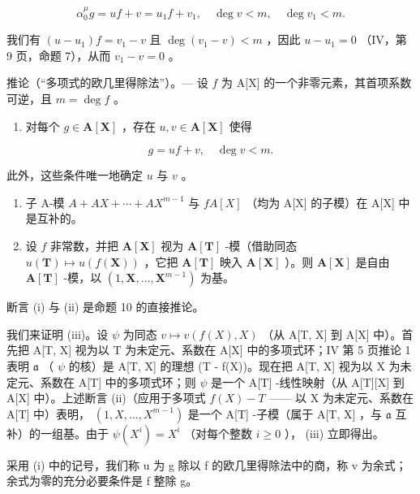 \[
\alpha_ {0} ^ {\mu} g = u f + v = u _ {1} f + v _ {1}, \quad \deg v <   m, \quad \deg v _ {1} <   m.
\]

我们有 \((u - u_{1})f = v_{1} - v\) 且 \(\deg (v_1 - v) < m\) ，因此 \(u - u_{1} = 0\) （IV，第 9 页，命题 7），从而 \(v_{1} - v = 0\) 。

推论（“多项式的欧几里得除法”）。--- 设 \(f\) 为 A{[}X{]} 的一个非零元素，其首项系数可逆，且 \(m = \deg f\) 。

\begin{enumerate}
\def\labelenumi{(\roman{enumi})}
\tightlist
\item
  对每个 \(g \in \mathbf{A}[\mathbf{X}]\) ，存在 \(u, v \in \mathbf{A}[\mathbf{X}]\) 使得
\end{enumerate}

\[
g = u f + v, \quad \deg v <   m.
\]

此外，这些条件唯一地确定 \(u\) 与 \(v\) 。

\begin{enumerate}
\def\labelenumi{(\roman{enumi})}
\setcounter{enumi}{1}
\item
  子 A-模 \(A + AX + \cdots + AX^{m-1}\) 与 \(fA[X]\) （均为 A{[}X{]} 的子模）在 A{[}X{]} 中是互补的。
\item
  设 \(f\) 非常数，并把 \(\mathbf{A}[\mathbf{X}]\) 视为 \(\mathbf{A}[\mathbf{T}]\) -模（借助同态 \(u(\mathbf{T}) \mapsto u(f(\mathbf{X}))\) ，它把 \(\mathbf{A}[\mathbf{T}]\) 映入 \(\mathbf{A}[\mathbf{X}]\) ）。则 \(\mathbf{A}[\mathbf{X}]\) 是自由 \(\mathbf{A}[\mathbf{T}]\) -模，以 \((1, \mathbf{X}, \ldots, \mathbf{X}^{m-1})\) 为基。
\end{enumerate}

断言 (i) 与 (ii) 是命题 10 的直接推论。

我们来证明 (iii)。设 \(\psi\) 为同态 \(v \mapsto v(f(X), X)\) （从 A{[}T, X{]} 到 A{[}X{]} 中）。首先把 A{[}T, X{]} 视为以 T 为未定元、系数在 A{[}X{]} 中的多项式环；IV 第 5 页推论 1 表明 \(\mathfrak{a}\) （ \(\psi\) 的核）是 A{[}T, X{]} 的理想 (T - f(X))。现在把 A{[}T, X{]} 视为以 X 为未定元、系数在 A{[}T{]} 中的多项式环；则 \(\psi\) 是一个 A{[}T{]} -线性映射（从 A{[}T{]}{[}X{]} 到 A{[}X{]} 中）。上述断言 (ii)（应用于多项式 \(f(X) - T\) —— 以 X 为未定元、系数在 A{[}T{]} 中）表明， \((1, X, ..., X^{m-1})\) 是一个 A{[}T{]} -子模（属于 A{[}T, X{]} ，与 \(\mathfrak{a}\) 互补）的一组基。由于 \(\psi(X^i) = X^i\) （对每个整数 \(i \geqslant 0\) ）， (iii) 立即得出。

采用 (i) 中的记号，我们称 u 为 g 除以 f 的欧几里得除法中的商，称 v 为余式；余式为零的充分必要条件是 f 整除 g。

